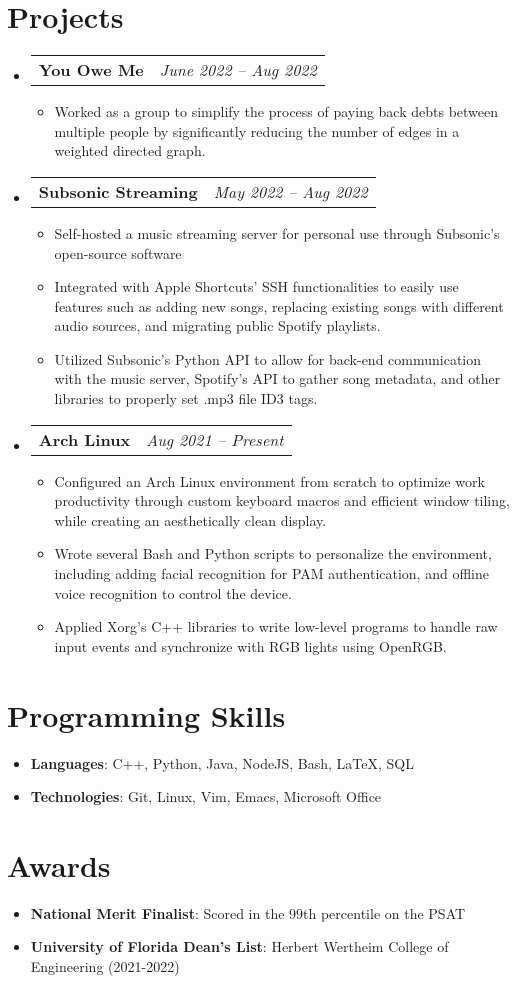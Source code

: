 \documentclass[letterpaper,11pt]{article}
\makeatletter
\newcommand{\resumeItemSkills}[2]{
  \item\normalsize{
    \textbf{#1}{: #2 \vspace{-2pt}}
  }
}
\newcommand{\resumeItemExperience}[1]{
  \item\small{
    {#1 \vspace{-2pt}}
  }
}
\newcommand{\resumeSubheadingProject}[2]{
  \vspace{-1pt}\item
    \begin{tabular*}{0.97\textwidth}{l@{\extracolsep{\fill}}r}
      \textbf{#1} & \textit{\small #2} \\
    \end{tabular*}\vspace{-5pt}
}
\newcommand{\resumeSubItemSkills}[2]{\resumeItemSkills{#1}{#2}\vspace{-4pt}}
\newcommand{\resumeSubHeadingListStart}{\begin{itemize}[leftmargin=*, label={}]}
\newcommand{\resumeSubHeadingListStartSkillsAwards}{\begin{itemize}[leftmargin=*]}
\newcommand{\resumeSubHeadingListEnd}{\end{itemize}}
\newcommand{\resumeItemListStart}{\begin{itemize}}
\newcommand{\resumeItemListEnd}{\end{itemize}\vspace{-5pt}}
\makeatother
\begin{document}
\section{Projects}
  \resumeSubHeadingListStart
        \resumeSubheadingProject
          {You Owe Me}{June 2022 -- Aug 2022}
          \resumeItemListStart
            \resumeItemExperience
              {Worked as a group to simplify the process of paying back debts between multiple people by significantly reducing the number of edges in a weighted directed graph.}
          \resumeItemListEnd
        \resumeSubheadingProject
          {Subsonic Streaming}{May 2022 -- Aug 2022}
          \resumeItemListStart
            \resumeItemExperience
              {Self-hosted a music streaming server for personal use through Subsonic's open-source software}
            \resumeItemExperience
              {Integrated with Apple Shortcuts' SSH functionalities to easily use features such as adding new songs, replacing existing songs with different audio sources, and migrating public Spotify playlists.}
            \resumeItemExperience
              {Utilized Subsonic's Python API to allow for back-end communication with the music server, Spotify's API to gather song metadata, and other libraries to properly set .mp3 file ID3 tags.}
          \resumeItemListEnd
        \resumeSubheadingProject
          {Arch Linux}{Aug 2021 -- Present}
          \resumeItemListStart
            \resumeItemExperience
              {Configured an Arch Linux environment from scratch to optimize work productivity through custom keyboard macros and efficient window tiling, while creating an aesthetically clean display.}
            \resumeItemExperience
              {Wrote several Bash and Python scripts to personalize the environment, including adding facial recognition for PAM authentication, and offline voice recognition to control the device.}
            \resumeItemExperience
              {Applied Xorg's C++ libraries to write low-level programs to handle raw input events and synchronize with RGB lights using OpenRGB.}
          \resumeItemListEnd
    \resumeSubHeadingListEnd
          
\section{Programming Skills}
 \resumeSubHeadingListStartSkillsAwards
   \resumeSubItemSkills{Languages}{C++, Python, Java, NodeJS, Bash, LaTeX, SQL}
    \resumeSubItemSkills{Technologies}{Git, Linux, Vim, Emacs, Microsoft Office}
 \resumeSubHeadingListEnd

\section{Awards}
  \resumeSubHeadingListStartSkillsAwards
    \resumeSubItemSkills{National Merit Finalist}
      {Scored in the 99th percentile on the PSAT}
    \resumeSubItemSkills{University of Florida Dean's List}
      {Herbert Wertheim College of Engineering (2021-2022)}
  \resumeSubHeadingListEnd
\end{document}
